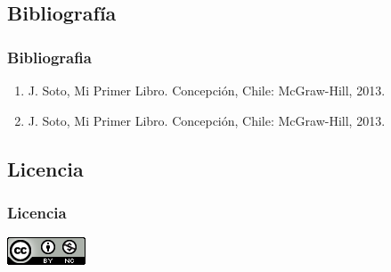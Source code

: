 \documentclass{beamer}
\begin{document}
\subsection{Bibliografía}
\begin{frame}
\frametitle{Bibliografia}
	\begin{enumerate}
		\item J. Soto, Mi Primer Libro.  Concepción, Chile: McGraw-Hill, 2013.
		\item J. Soto, Mi Primer Libro.  Concepción, Chile: McGraw-Hill, 2013.
	\end{enumerate}
\end{frame}

\subsection{Licencia}
\begin{frame}
\frametitle{Licencia}
\begin{center}
\href{http://www.google.com}{\includegraphics[scale=.8]{cc}}
\end{center}
\end{frame}

\MuchasGraciasFrame
\end{document}
